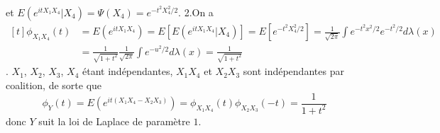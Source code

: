\documentclass{report}
\begin{document}
et $E(e^{itX_1X_4}|X_4)=\Psi(X_4)=e^{-t^2X^2_4/2}$. \newline
\newline
2.On a $\begin{aligned}[t] \phi_{X_1X_4}(t) &= E(e^{itX_1X_4}) = E[ E(e^{itX_1X_4}|X_4)] = E[e^{-t^2X^2_4/2}]=\frac{1}{\sqrt{2\pi}}\int e^{-t^2x^2/2} e^{-t^2/2}d\lambda(x) \\
&= \frac{1}{\sqrt{1+t^2}}\frac{1}{\sqrt{2\pi}}\int e^{-u^2/2}d\lambda(x) = \frac{1}{\sqrt{1+t^2}}
\end{aligned}$\newline
{}. $X_1$, $X_2$, $X_3$, $X_4$ étant indépendantes, $X_1X_4$ et $X_2X_3$ sont indépendantes par coalition, de sorte que 
$$\phi_Y(t)=E(e^{it(X_1X_4-X_2X_3)})=\phi_{X_1X_4}(t)\phi_{X_2X_3}(-t)=\frac{1}{1+t^2}$$
donc $Y$ suit la loi de Laplace de paramètre $1$.
\end{document}
